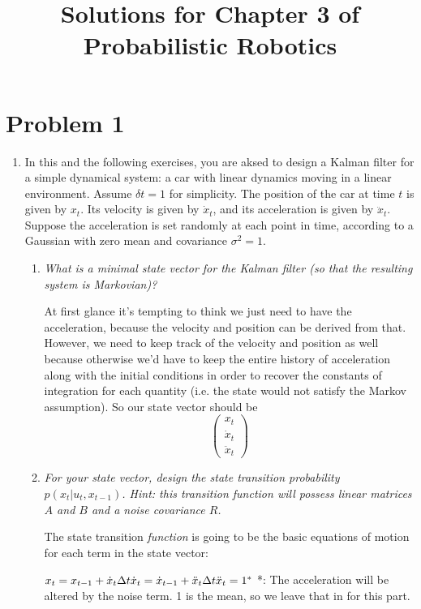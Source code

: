 \documentclass[10pt]{article}
\begin{document}
\title{Solutions for Chapter 3 of Probabilistic Robotics}

\section{Problem 1}
\begin{enumerate}
  \item In this and the following exercises, you are aksed to design a Kalman
filter for a simple dynamical system: a car with linear dynamics moving in a
linear environment. Assume $\delta t = 1$ for simplicity. The position of the
car at time $t$ is given by $x_t$. Its velocity is given by $\dot{x}_t$, and its
acceleration is given by $\ddot{x}_t$. Suppose the acceleration is set
randomly at each point in time, according to a Gaussian with zero mean and
covariance $\sigma^2 = 1$.

  \begin{enumerate}
  \item \textit{What is a minimal state vector for the Kalman filter (so that the
resulting system is Markovian)?} 

At first glance it's tempting to think we just need to have the acceleration,
because the velocity and position can be derived from that.  However, we need to
keep track of the velocity and position as well because otherwise we'd have to
keep the entire history of acceleration along with the initial conditions in
order to recover the constants of integration for each quantity (i.e. the state
would not satisfy the Markov assumption). So our state vector should be
$$ \begin{pmatrix} x_t \\ \dot{x}_t \\ \ddot{x}_t \end{pmatrix} $$

  \item \textit{For your state vector, design the state transition probability 
  $p(x_t | u_t,x_{t-1})$. Hint: this transition function will possess linear
  matrices $A$ and $B$ and a noise covariance $R$.}

  The state transition \textit{function} is going to be the basic equations of
  motion for each term in the state vector:

  \begin{math}
  x_t = x_{t-1} + \dot{x}_t \Delta t \\ 
  \dot{x}_t = \dot{x}_{t-1} + \ddot{x}_t \Delta t \\ 
  \ddot{x}_t = 1^*\\ 
  \end{math}
  *: The acceleration will be altered by the noise term. 1 is the mean, so we
  leave that in for this part.


\end{enumerate}
\end{enumerate}
\end{document}
